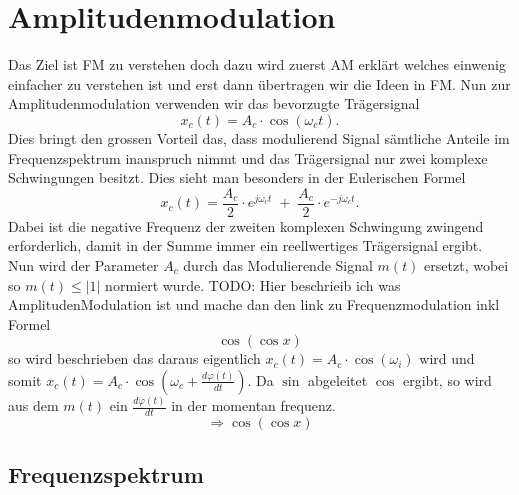 %
%
%
\section{Amplitudenmodulation\label{fm:section:teil0}}

Das Ziel ist FM zu verstehen doch dazu wird zuerst AM erklärt welches einwenig einfacher zu verstehen ist und erst dann übertragen wir die Ideen in FM.
Nun zur Amplitudenmodulation verwenden wir das bevorzugte Trägersignal
\[
    x_c(t) = A_c \cdot \cos(\omega_ct).
\]
Dies bringt den grossen Vorteil das, dass modulierend Signal sämtliche Anteile im Frequenzspektrum inanspruch nimmt 
und das Trägersignal nur  zwei komplexe Schwingungen besitzt. 
Dies sieht man besonders in der Eulerischen Formel
\[
    x_c(t) = \frac{A_c}{2} \cdot e^{j\omega_ct}\;+\;\frac{A_c}{2} \cdot e^{-j\omega_ct}.
\]
Dabei ist die negative Frequenz der zweiten komplexen Schwingung zwingend erforderlich, damit in der Summe immer ein reellwertiges Trägersignal ergibt.
Nun wird der Parameter \(A_c\) durch das  Modulierende Signal \(m(t)\) ersetzt, wobei so \(m(t) \leqslant |1|\) normiert wurde.
\newline
\newline
TODO:
Hier beschrieib ich was AmplitudenModulation ist und mache dan den link zu Frequenzmodulation inkl Formel \[\cos( \cos x)\]
so wird beschrieben das daraus eigentlich \(x_c(t) = A_c \cdot \cos(\omega_i)\) wird und somit \(x_c(t) = A_c \cdot \cos(\omega_c + \frac{d \varphi(t)}{dt})\).
Da \(\sin \) abgeleitet \(\cos \) ergibt, so wird aus dem \(m(t)\) ein \( \frac{d \varphi(t)}{dt}\)  in der momentan frequenz. \[ \Rightarrow \cos( \cos x) \]

\subsection{Frequenzspektrum}